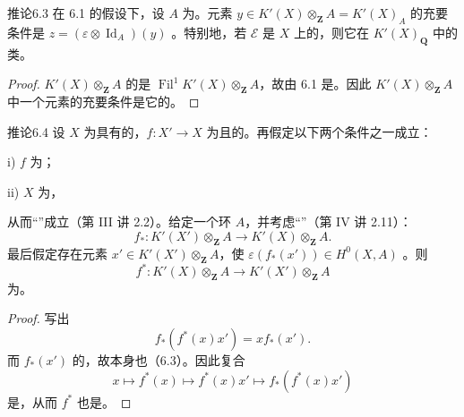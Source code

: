 \begin{SGAresult}{推论}{6.3}
在 6.1 的假设下，设 $A$ 为。元素 $y\in K'(X)\otimes_{\mathbf Z}A=K'(X)_A$ 的充要条件是 $z=(\varepsilon\otimes\operatorname{Id}_A)(y)$ 。特别地，若 $\mathcal E$ 是 $X$ 上的，则它在 $K'(X)_{\mathbf Q}$ 中的类。
\end{SGAresult}
\begin{proof}
$K'(X)\otimes_{\mathbf Z}A$ 的是 $\operatorname{Fil}^1K'(X)\otimes_{\mathbf Z}A$，故由 6.1 是。因此 $K'(X)\otimes_{\mathbf Z}A$ 中一个元素的充要条件是它的。
\end{proof}

\begin{SGAresult}{推论}{6.4}
设 $X$ 为具有的，$f\colon X'\longrightarrow X$ 为且的。再假定以下两个条件之一成立：

\textup{i)} $f$ 为；

\textup{ii)} $X$ 为，

从而“”成立（第 III 讲 2.2）。给定一个环 $A$，并考虑“”（第 IV 讲 2.11）：
\[
f_*\colon K'(X')\otimes_{\mathbf Z}A\longrightarrow K'(X)\otimes_{\mathbf Z}A.
\]
最后假定存在元素 $x'\in K'(X')\otimes_{\mathbf Z}A$，使 $\varepsilon(f_*(x'))\in H^0(X,A)$ 。则
\[
f^*\colon K'(X)\otimes_{\mathbf Z}A\longrightarrow K'(X')\otimes_{\mathbf Z}A
\]
为。
\end{SGAresult}
\begin{proof}
写出
\[
f_*(f^*(x)x')=xf_*(x').
\]
而 $f_*(x')$ 的，故本身也（6.3）。因此复合
\[
x\longmapsto f^*(x)\longmapsto f^*(x)x'\longmapsto f_*(f^*(x)x')
\]
是，从而 $f^*$ 也是。
\end{proof}

